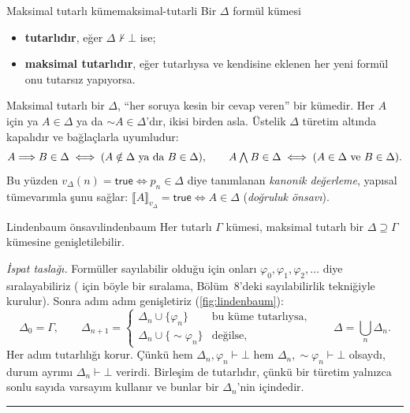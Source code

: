 \begin{tanim}{Maksimal tutarlı küme}{maksimal-tutarli}
Bir $\Delta$ formül kümesi
\begin{itemize}
  \item \textbf{tutarlıdır}, eğer $\Delta \nvdash \bot$ ise;
  \item \textbf{maksimal tutarlıdır}, eğer tutarlıysa ve kendisine
        eklenen her yeni formül onu tutarsız yapıyorsa.
\end{itemize}
\end{tanim}

\noindent Maksimal tutarlı bir $\Delta$, ``her soruya kesin bir cevap
veren'' bir kümedir. Her $A$ için ya $A \in \Delta$ ya da ${\sim}A \in
\Delta$'dır, ikisi birden asla. Üstelik $\Delta$ türetim altında
kapalıdır ve bağlaçlarla uyumludur:
\[
  A \Longrightarrow B \in \Delta \iff (A \notin \Delta \text{ ya da } B \in \Delta),
  \qquad
  A \mathbin{\textstyle\bigwedge} B \in \Delta \iff (A \in \Delta \text{ ve } B \in \Delta).
\]
Bu yüzden $v_\Delta(n) = \mathsf{true} \iff p_n \in \Delta$ diye
tanımlanan \emph{kanonik değerleme}, yapısal tümevarımla şunu sağlar:
$\lBrack A \rBrack_{v_\Delta} = \mathsf{true} \iff A \in \Delta$
(\emph{doğruluk önsavı}).

\begin{teorem}{Lindenbaum önsavı}{lindenbaum}
Her tutarlı $\Gamma$ kümesi, maksimal tutarlı bir $\Delta \supseteq
\Gamma$ kümesine genişletilebilir.
\end{teorem}

\noindent \emph{İspat taslağı.} Formüller sayılabilir olduğu için onları
$\varphi_0, \varphi_1, \varphi_2, \dots$ diye sıralayabiliriz
( için böyle bir sıralama, Bölüm~8'deki sayılabilirlik
tekniğiyle kurulur). Sonra adım adım genişletiriz
(\cref{fig:lindenbaum}):
\[
  \Delta_0 = \Gamma, \qquad
  \Delta_{n+1} =
  \begin{cases}
    \Delta_n \cup \{\varphi_n\} & \text{bu küme tutarlıysa},\\
    \Delta_n \cup \{{\sim}\varphi_n\} & \text{değilse},
  \end{cases}
  \qquad
  \Delta = \bigcup_n \Delta_n .
\]
Her adım tutarlılığı korur. Çünkü hem $\Delta_n, \varphi_n \vdash \bot$
hem $\Delta_n, {\sim}\varphi_n \vdash \bot$ olsaydı, durum ayrımı
$\Delta_n \vdash \bot$ verirdi. Birleşim de tutarlıdır, çünkü bir
türetim yalnızca sonlu sayıda varsayım kullanır ve bunlar bir
$\Delta_n$'nin içindedir. \hfill\textcolor{teoremframe}{\rule{0.55em}{0.55em}}

